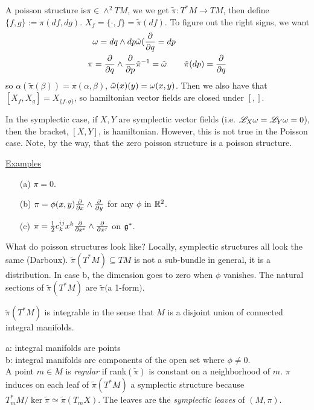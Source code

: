  \setcounter{lecture}{26}

 A poisson structure is$\pi \in \wedge^2 TM$, we we get $\tilde \pi: T^*M\to TM$, then
 define $\{f,g\}:=\pi(df,dg)$.  $X_f=\{\cdot, f\}= \tilde \pi(df)$.  To figure out the
 right signs, we want
 \begin{align*}
   \omega=dq\wedge dp & \tilde {\omega}(\frac{\partial }{\partial q}=dp\\
   \pi=\frac{\partial }{\partial q}\wedge\frac{\partial }{\partial p} & \tilde \pi^{-1}=\tilde {\omega} & \tilde
   \pi(dp)=\frac{\partial }{\partial q}
 \end{align*}
 so $\alpha(\tilde \pi(\beta))=\pi(\alpha,\beta)$, $\tilde{\omega}(x)(y)=\omega(x,y)$.  Then we
 also have that $[X_f,X_g]=X_{\{f,g\}}$, so hamiltonian vector fields are closed under
 $[,]$.

 In the symplectic case, if $X,Y$ are symplectic vector fields (i.e.
 $\mathscr{L}_X\omega=\mathscr{L}_Y\omega=0$), then the bracket, $[X,Y]$, is hamiltonian.  However, this is not
 true in the Poisson case.  Note, by the way, that the zero poisson structure is a
 poisson structure.

 \underline{Examples}
 \begin{itemize}
 \item[(a)] $\pi=0$.
 \item[(b)] $\pi=\phi(x,y)\frac{\partial }{\partial x}\wedge \frac{\partial }{\partial y}$ for any $\phi$ in $\mathbb{R}^2$.
 \item[(c)] $\pi = \frac{1}{2}c_k^{ij} x^k\frac{\partial }{\partial x^i}\wedge \frac{\partial }{\partial x^j}$ on $\mathfrak{g}^*$.
 \end{itemize}

 What do poisson structures look like?  Locally, symplectic structures all look the
 same (Darboux).  $\tilde\pi (T^*M)\subseteq TM$ is not a sub-bundle in general, it is
 a distribution.  In case b, the dimension goes to zero when $\phi$ vanishes.  The
 natural sections of $\tilde\pi(T^*M)$ are $\tilde \pi($a 1-form$)$.
 \begin{theorem}
   $\tilde\pi (T^*M)$ is integrable in the sense that $M$ is a disjoint union of
   connected integral manifolds.
 \end{theorem}
 a: integral manifolds are points\\
 b: integral manifolds are components of the open set where $\phi\neq 0$.\\

 A point $m\in M$ is \emph{regular} if rank$(\tilde \pi)$ is constant on a
 neighborhood of $m$.  $\pi$ induces on each leaf of $\tilde \pi(T^*M)$ a symplectic
 structure because $T_m^*M/\ker \tilde \pi\simeq \tilde \pi (T_mX)$.  The leaves are
 the \emph{symplectic leaves} of $(M,\pi)$.

